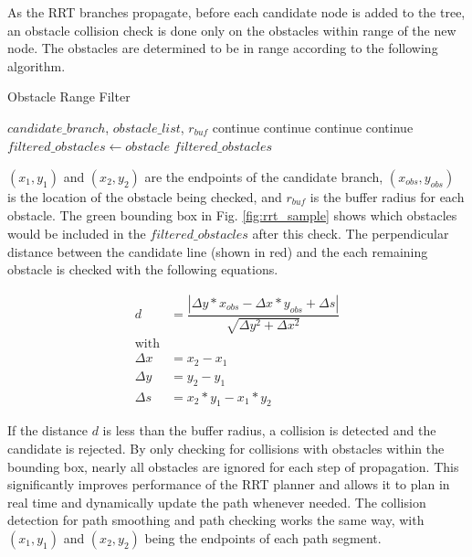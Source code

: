\documentclass[letterpaper, 10 pt, conference]{ieeeconf}  %
\begin{document}
As the RRT branches propagate, before each candidate node is added to the tree, an obstacle collision check is done only on the obstacles within range of the new node. The obstacles are determined to be in range according to the following algorithm.

\begin{algorithm}
  \caption{Obstacle Range Filter}
  \label{dyn_path_plan}
\begin{algorithmic}
  \REQUIRE $\mathit{candidate\_branch}$, $\mathit{obstacle\_list}$, $r_{\mathit{buf}}$
      \STATE continue
      \STATE continue
      \STATE continue
      \STATE continue
    \ELSE
      \STATE $\mathit{filtered\_obstacles} \gets \mathit{obstacle}$
    \ENDIF
  \ENDFOR
  \RETURN $\mathit{filtered\_obstacles}$
\end{algorithmic}
\end{algorithm}

 $(x_1,y_1)$ and $(x_2,y_2)$ are the endpoints of the candidate branch, $(x_{\mathit{obs}},y_{\mathit{obs}})$ is the location of the obstacle being checked, and $r_{\mathit{buf}}$ is the buffer radius for each obstacle. The green bounding box in Fig. \ref{fig:rrt_sample} shows which obstacles would be included in the $\mathit{filtered\_obstacles}$ after this check. The perpendicular distance between the candidate line (shown in red) and the each remaining obstacle is checked with the following equations.

\begin{align}
  d &= \dfrac{|\Delta y*x_{\mathit{obs}} -
      \Delta x*y_{\mathit{obs}} + \Delta s|}
      {\sqrt{\Delta y^2 + \Delta x^2}}\\
  \nonumber \text{with}\\
  \Delta x &= x_2 - x_1\\
  \Delta y &= y_2 - y_1\\
  \Delta s &= x_2*y_1 -x_1*y_2
\end{align}

 If the distance $d$ is less than the buffer radius, a collision is detected and the candidate is rejected. By only checking for collisions with obstacles within the bounding box, nearly all obstacles are ignored for each step of propagation. This significantly improves performance of the RRT planner and allows it to plan in real time and dynamically update the path whenever needed. The collision detection for path smoothing and path checking works the same way, with $(x_1,y_1)$ and $(x_2,y_2)$ being the endpoints of each path segment.
\end{document}
